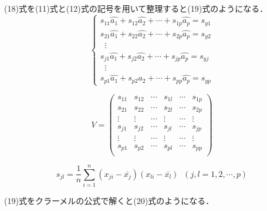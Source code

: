 \documentclass[dvipdfmx]{jsarticle}
\begin{document}
(18)式を(11)式と(12)式の記号を用いて整理すると(19)式のようになる．
\begin{equation}
  \begin{cases}
    s_{11}\hat{a_1}+s_{12}\hat{a_2}+\cdots+s_{1p}\hat{a_p}=s_{y1} \\
    s_{21}\hat{a_1}+s_{22}\hat{a_2}+\cdots+s_{2p}\hat{a_p}=s_{y2} \\
    \; \; \vdots                                                  \\
    s_{j1}\hat{a_1}+s_{j2}\hat{a_2}+\cdots+s_{jp}\hat{a_p}=s_{yj} \\
    \; \; \vdots                                                  \\
    s_{p1}\hat{a_1}+s_{p2}\hat{a_2}+\cdots+s_{pp}\hat{a_p}=s_{yp}
  \end{cases}
\end{equation}

\begin{equation}
  V =
  \begin{pmatrix}
    s_{11} & s_{12} & \cdots & s_{1l} & \cdots & s_{1p} \\
    s_{21} & s_{22} & \cdots & s_{2l} & \cdots & s_{2p} \\
    \vdots & \vdots & \cdots & \vdots & \cdots & \vdots \\
    s_{j1} & s_{j2} & \cdots & s_{jl} & \cdots & s_{jp} \\
    \vdots & \vdots & \cdots & \vdots & \cdots & \vdots \\
    s_{p1} & s_{p2} & \cdots & s_{pl} & \cdots & s_{pp} \\
  \end{pmatrix}
  \tag{11}
\end{equation}

\begin{equation}
  s_{jl}=\frac{1}{n}\sum_{i=1}^n (x_{ji}-\bar{x_j})(x_{li}-\bar{x_l}) \; \; (j,l=1, 2, \cdots, p)
  \tag{12}
\end{equation}

(19)式をクラーメルの公式で解くと(20)式のようになる．
\end{document}
